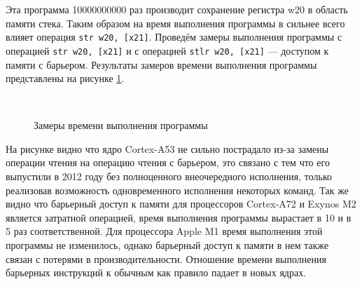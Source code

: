 
Эта программа 10000000000 раз производит сохранение регистра w20 в область памяти стека. Таким образом на время выполнения программы в сильнее всего влияет операция \texttt{str w20, [x21]}. Проведём замеры выполнения программы с операцией \texttt{str w20, [x21]} и с операцией \texttt{stlr w20, [x21]} --- доступом к памяти с барьером. Результаты замеров времени выполнения программы представлены на рисунке \ref{fig:speed}.

\begin{figure}[hbtp]
	\centering
	\\
	\caption{Замеры времени выполнения программы}
	\label{fig:speed}
\end{figure}

На рисунке видно что ядро Cortex-A53 не сильно пострадало из-за замены операции чтения на операцию чтения с барьером, это связано с тем что его выпустили в 2012 году без полноценного внеочередного исполнения, только реализовав возможность одновременного исполнения некоторых команд. Так же видно что барьерный доступ к памяти для процессоров Cortex-A72 и Exynos M2 является затратной операцией, время выполнения программы вырастает в 10 и в 5 раз соответственной. Для процессора Apple M1 время выполнения этой программы не изменилось, однако барьерный доступ к памяти в нем также связан с потерями в производительности. Отношение времени выполнения барьерных инструкций к обычным как правило падает в новых ядрах.

